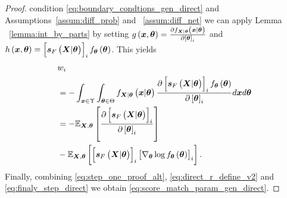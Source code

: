 \begin{proof}
{     %
     condition \eqref{eq:boundary_condtions_gen_direct} %
     and Assumptions~\ref{assum:diff_prob} and ~\ref{assum:diff_net} we can %
     apply} Lemma ~\ref{lemma:int_by_parts} by setting $g\brackets{\x,\p}=\divc{\probt{\vectorsym{x}|\p}{\X|\p}}{\squareb{\p}_i}$ and ${h}\brackets{\x,\p}=\squareb{\lscore{\X}{\p}}_i\probt{\p}{\p}$. %
     This yields
\begin{align}\label{eq:finaly_step_direct}
    &w_i\nonumber\\
    &=-\int_{\x\in\Upsilon}\int_{\p\in\Theta}\probt{\vectorsym{x}|\p}{\X|\p} \divc{\squareb{\lscore{\X}{\p}}_i\probt{\p}{\p}}{\squareb{\p}_i}d\x d\p\nonumber\\
        &=-\expectation{\divc{\squareb{\lscore{\X}{\p}}_i}{\squareb{\p}_i}}{\X,\p}
        \nonumber\\
        &-\expectation{\squareb{\lscore{\X}{\p}}_i\squareb{\nabla_{\p}\log\probt{\p}{\p}}_i}{\X,\p}.
\end{align}
Finally,  combining \eqref{eq:step_one_proof_alt}, \eqref{eq:direct_r_define_v2} and \eqref{eq:finaly_step_direct} we obtain %
\eqref{eq:score_match_param_gen_direct}.
\end{proof}
